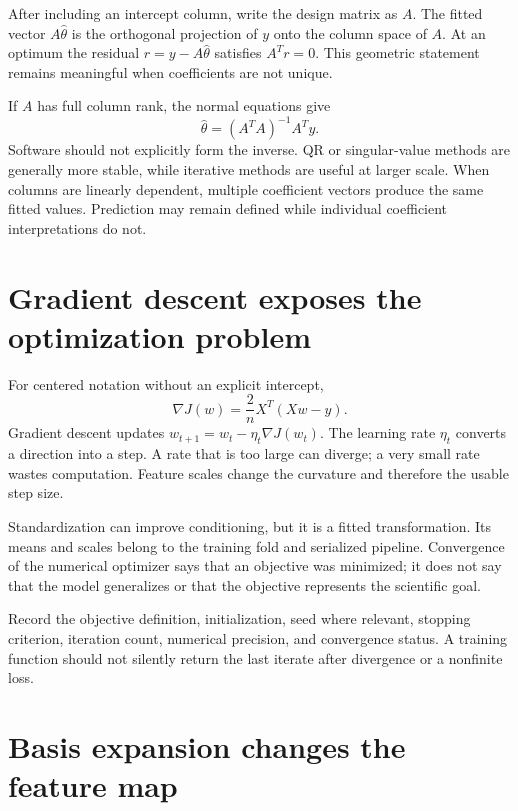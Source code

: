 After including an intercept column, write the design matrix as $A$. The fitted
vector $A\widehat\theta$ is the orthogonal projection of $y$ onto the column
space of $A$. At an optimum the residual $r=y-A\widehat\theta$ satisfies
$A^Tr=0$. This geometric statement remains meaningful when coefficients are
not unique.

If $A$ has full column rank, the normal equations give
\[
\widehat\theta=(A^TA)^{-1}A^Ty.
\]
Software should not explicitly form the inverse. QR or singular-value methods
are generally more stable, while iterative methods are useful at larger scale.
When columns are linearly dependent, multiple coefficient vectors produce the
same fitted values. Prediction may remain defined while individual coefficient
interpretations do not.


\section{Gradient descent exposes the optimization problem}

For centered notation without an explicit intercept,
\[
\nabla J(w)=\frac{2}{n}X^T(Xw-y).
\]
Gradient descent updates $w_{t+1}=w_t-\eta_t\nabla J(w_t)$. The learning rate
$\eta_t$ converts a direction into a step. A rate that is too large can diverge;
a very small rate wastes computation. Feature scales change the curvature and
therefore the usable step size.

Standardization can improve conditioning, but it is a fitted transformation.
Its means and scales belong to the training fold and serialized pipeline.
Convergence of the numerical optimizer says that an objective was minimized; it
does not say that the model generalizes or that the objective represents the
scientific goal.

\begin{professionalbox}
Record the objective definition, initialization, seed where relevant, stopping
criterion, iteration count, numerical precision, and convergence status. A
training function should not silently return the last iterate after divergence
or a nonfinite loss.
\end{professionalbox}

\section{Basis expansion changes the feature map}

